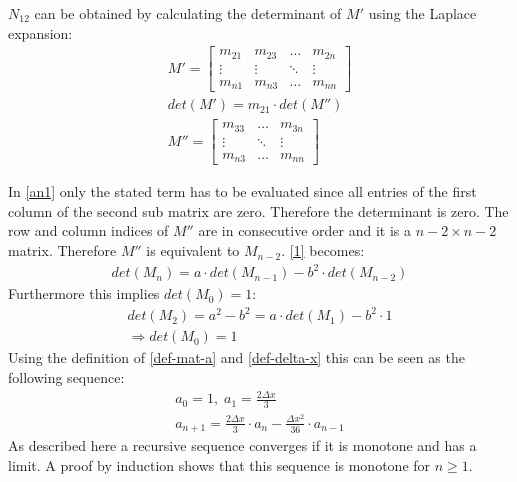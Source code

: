 \(N_{12}\) can be obtained by calculating the determinant of \(M'\) using the Laplace expansion:
\begin{gather}
M' = \begin{bmatrix}
m_{21} & m_{23} & \dots & m_{2n}\\
\vdots & \vdots & \ddots & \vdots \\
m_{n1} & m_{n3} & \dots & m_{nn}
\end{bmatrix} \\
det(M') = m_{21} \cdot det(M'') \label{an1} \\
M'' = \begin{bmatrix}
m_{33} & \dots & m_{3n}\\
\vdots & \ddots & \vdots \\
m_{n3} & \dots & m_{nn}
\end{bmatrix}
\end{gather}

In \ref{an1} only the stated term has to be evaluated since all entries of the first column of the second sub matrix are zero. 
Therefore the determinant is zero.
The row and column indices of \(M''\) are in consecutive order and it is a \(n-2 \times n-2\) matrix.
Therefore \(M''\) is equivalent to \(M_{n-2}\).
\ref{1} becomes:
\begin{gather}
det(M_n) = a \cdot det(M_{n-1}) - b^{2} \cdot det(M_{n-2})
\end{gather}
Furthermore this implies \(det(M_0) = 1\):
\begin{gather}
det(M_2) = a^{2} - b^{2} =  a \cdot det(M_1) - b^{2} \cdot 1 \\
\Rightarrow det(M_0) = 1
\end{gather}
Using the definition of \ref{def-mat-a} and \ref{def-delta-x} this can be seen as the following sequence:
\begin{gather}
a_0 = 1, \; a_1 = \frac{2 \Delta x}{3} \\
a_{n+1} = \frac{2 \Delta x}{3} \cdot a_{n} - \frac{\Delta x^2}{36} \cdot a_{n-1} 
\end{gather}
As described here \cite{Michael2017} a recursive sequence converges if it is monotone and has a limit.
A proof by induction shows that this sequence is monotone for \(n \geq 1\).


